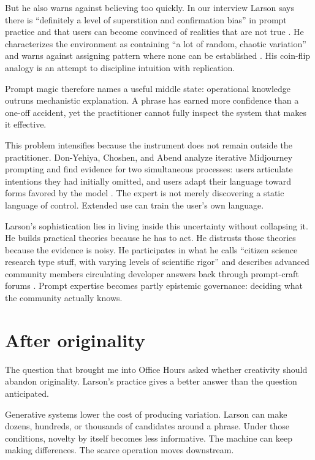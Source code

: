 \documentclass[11pt]{article}
\begin{document}
But he also warns against believing too quickly. In our interview Larson says there is ``definitely a level of superstition and confirmation bias'' in prompt practice and that users can become convinced of realities that are not true \cite{Larson2022}. He characterizes the environment as containing ``a lot of random, chaotic variation'' and warns against assigning pattern where none can be established \cite{Larson2022}. His coin-flip analogy is an attempt to discipline intuition with replication.

Prompt magic therefore names a useful middle state: operational knowledge outruns mechanistic explanation. A phrase has earned more confidence than a one-off accident, yet the practitioner cannot fully inspect the system that makes it effective.

This problem intensifies because the instrument does not remain outside the practitioner. Don-Yehiya, Choshen, and Abend analyze iterative Midjourney prompting and find evidence for two simultaneous processes: users articulate intentions they had initially omitted, and users adapt their language toward forms favored by the model \cite{DonYehiyaChoshenAbend2023}. The expert is not merely discovering a static language of control. Extended use can train the user's own language.

Larson's sophistication lies in living inside this uncertainty without collapsing it. He builds practical theories because he has to act. He distrusts those theories because the evidence is noisy. He participates in what he calls ``citizen science research type stuff, with varying levels of scientific rigor'' and describes advanced community members circulating developer answers back through prompt-craft forums \cite{Larson2022}. Prompt expertise becomes partly epistemic governance: deciding what the community actually knows.

\section{After originality}
The question that brought me into Office Hours asked whether creativity should abandon originality. Larson's practice gives a better answer than the question anticipated.

Generative systems lower the cost of producing variation. Larson can make dozens, hundreds, or thousands of candidates around a phrase. Under those conditions, novelty by itself becomes less informative. The machine can keep making differences. The scarce operation moves downstream.
\end{document}
